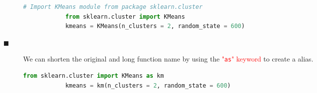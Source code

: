 \documentclass{book}
\begin{document}
\begin{description}
\begin{description}
\begin{lstlisting}[language=Python, basicstyle=\ttfamily\small, keywordstyle=\color{blue}, commentstyle=\color{forestgreen}, stringstyle=\color{red}, showstringspaces=false]
            # Import KMeans module from package sklearn.cluster
            from sklearn.cluster import KMeans
            kmeans = KMeans(n_clusters = 2, random_state = 600)
        \end{lstlisting}
        \item[$\blacksquare$] We can shorten the original and long function name by using the \textcolor{red}{"\texttt{as}" keyword} to create a alias.
        \begin{lstlisting}[language=Python, basicstyle=\ttfamily\small, keywordstyle=\color{blue}, commentstyle=\color{forestgreen}, stringstyle=\color{red}, showstringspaces=false]
            from sklearn.cluster import KMeans as km
            kmeans = km(n_clusters = 2, random_state = 600)
        \end{lstlisting}
    \end{description}
\end{description}
\end{document}
